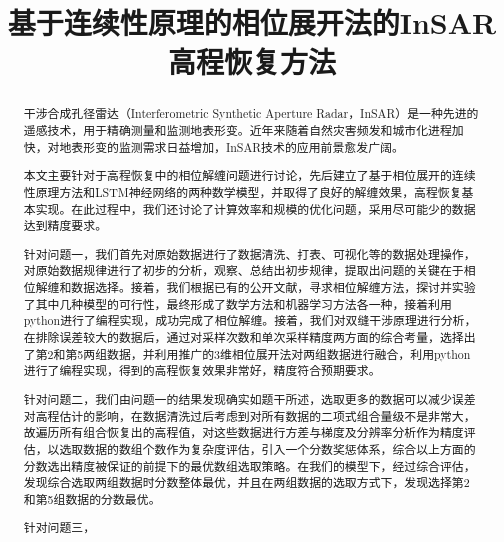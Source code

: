 \documentclass[a4paper]{article}
\title{\textbf{基于连续性原理的相位展开法的InSAR高程恢复方法}}
\date{} %
\begin{document}
	\maketitle
	\vspace{-6em} %
	\begin{abstract}

		干涉合成孔径雷达（Interferometric Synthetic Aperture Radar，InSAR）是一种先进的遥感技术，用于精确测量和监测地表形变。近年来随着自然灾害频发和城市化进程加快，对地表形变的监测需求日益增加，InSAR技术的应用前景愈发广阔。\par
		本文主要针对于高程恢复中的相位解缠问题进行讨论，先后建立了基于相位展开的连续性原理方法和LSTM神经网络的两种数学模型，并取得了良好的解缠效果，高程恢复基本实现。在此过程中，我们还讨论了计算效率和规模的优化问题，采用尽可能少的数据达到精度要求。\par
		针对问题一，我们首先对原始数据进行了数据清洗、打表、可视化等的数据处理操作，对原始数据规律进行了初步的分析，观察、总结出初步规律，提取出问题的关键在于相位解缠和数据选择。接着，我们根据已有的公开文献，寻求相位解缠方法，探讨并实验了其中几种模型的可行性，最终形成了数学方法和机器学习方法各一种，接着利用python进行了编程实现，成功完成了相位解缠。接着，我们对双缝干涉原理进行分析，在排除误差较大的数据后，通过对采样次数和单次采样精度两方面的综合考量，选择出了第2和第5两组数据，并利用推广的3维相位展开法对两组数据进行融合，利用python进行了编程实现，得到的高程恢复效果非常好，精度符合预期要求。\par
		针对问题二，我们由问题一的结果发现确实如题干所述，选取更多的数据可以减少误差对高程估计的影响，在数据清洗过后考虑到对所有数据的二项式组合量级不是非常大，故遍历所有组合恢复出的高程值，对这些数据进行方差与梯度及分辨率分析作为精度评估，以选取数据的数组个数作为复杂度评估，引入一个分数奖惩体系，综合以上方面的分数选出精度被保证的前提下的最优数组选取策略。在我们的模型下，经过综合评估，发现综合选取两组数据时分数整体最优，并且在两组数据的选取方式下，发现选择第2和第5组数据的分数最优。\par
		针对问题三，\\
		\newline
	\end{abstract}
	
	\clearpage %
	
\end{document}
